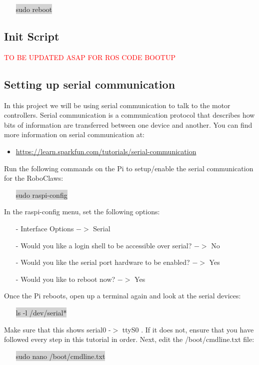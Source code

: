 \documentclass[12pt]{article}
\begin{document}
\begin{itemize}
	\item[] \colorbox{lightgray}{sudo reboot}
\end{itemize}


\subsection{Init Script}

\textcolor{red}{TO BE UPDATED ASAP FOR ROS CODE BOOTUP}

\subsection{Setting up serial communication}	

In this project we will be using serial communication to talk to the motor controllers. Serial communication is a communication protocol that describes how bits of information are transferred between one device and another. You can find more information on serial communication at:
\begin{itemize}
	\item \href{https://learn.sparkfun.com/tutorials/serial-communication}{https://learn.sparkfun.com/tutorials/serial-communication}
\end{itemize}

\noindent Run the following commands on the Pi to setup/enable the serial communication for the RoboClaws:
\begin{itemize}
	\item[] \colorbox{lightgray}{sudo raspi-config}
\end{itemize}

\noindent In the raspi-config menu, set the following options:
\begin{itemize}
	\item[-]  Interface Options $-> $ Serial 
	\item[-] Would you like a login shell to be accessible over serial? $->$ No
	\item[-] Would you like the serial port hardware to be enabled? $->$ Yes
	\item[-] Would you like to reboot now? $->$ Yes
\end{itemize} 
\noindent Once the Pi reboots, open up a terminal again and look at the serial devices:
\begin{itemize}
	\item[] \colorbox{lightgray}{ls -l /dev/serial*}
\end{itemize}
Make sure that this shows serial0 -$>$ ttyS0 . If it does not, ensure that you have followed every step in this tutorial in order. Next, edit the /boot/cmdline.txt file:
\begin{itemize}
	\item [] \colorbox{lightgray}{sudo nano /boot/cmdline.txt}
\end{itemize}
\end{document}
